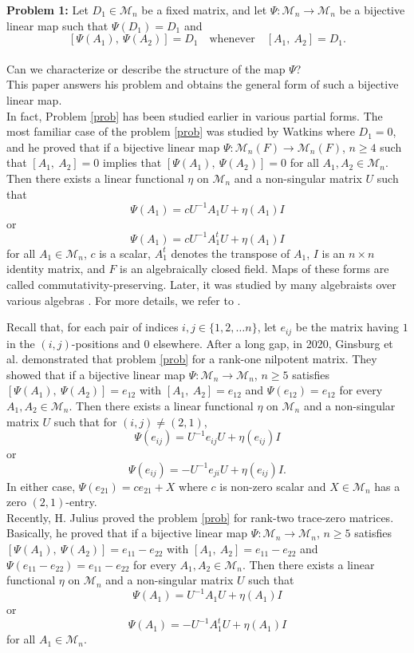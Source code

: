 \documentclass{amsart}
\theoremstyle{definition}
\theoremstyle{remark}
\numberwithin{equation}{section}
\begin{document}
 \textbf{Problem 1:}\label{prob} Let $D_1\in \mathscr{M}_n$ be a fixed matrix, and let $\Psi: \mathscr{M}_n \to \mathscr{M}_n$ be a bijective linear map such that $\Psi(D_1)=D_1$ and
	$$
	[\Psi(A_1),~\Psi(A_2)] = D_1 \quad \text{whenever} \quad  [A_1,~A_2] = D_1.
	$$\\
Can we characterize or describe the structure of the map $\Psi$?\\
This paper answers his problem and obtains the general form of such a bijective linear map.\\

In fact, Problem \ref{prob} has been studied earlier in various partial forms. The most familiar case of the problem \ref{prob} was studied by Watkins \cite{wat} where $D_1=0$, and he proved that if a bijective linear map $\Psi:\mathscr{M}_n(F) \to \mathscr{M}_n(F)$, $n\geq4$ such that $[A_1,~A_2]=0$ implies that $[\Psi(A_1),~\Psi(A_2)]=0$ for all $A_1,A_2 \in \mathscr{M}_n$. Then there exists a linear functional $\eta$ on $\mathscr{M}_n$ and a non-singular matrix $U$ such that $$\Psi(A_1)=cU^{-1}A_1U+\eta(A_1)I$$ or $$\Psi(A_1)=cU^{-1}A_1^tU+\eta(A_1)I$$ for all $A_1 \in \mathscr{M}_n$, $c$ is a scalar, $A_1^t$ denotes the transpose of $A_1$, $I$ is an $n\times n$ identity matrix, and $F$ is an algebraically closed field. Maps of these forms are called commutativity-preserving. Later, it was studied by many algebraists over various algebras \cite{bei1,bei2,bei3,bre1,bre2,Lin}. For more details, we refer to \cite{shi,cat2}.

Recall that, for each pair of indices $i,j \in \{1,2, \dots n \}$, let $e_{ij}$ be the matrix having $1$ in the $(i,j)$-positions and $0$ elsewhere. After a long gap, in 2020, Ginsburg et al. \cite{gin} demonstrated that problem \ref{prob} for a rank-one nilpotent matrix. They showed that if a bijective linear map $\Psi:\mathscr{M}_n \to \mathscr{M}_n$, $n\geq5$ satisfies $[\Psi(A_1),~ \Psi(A_2)]=e_{12}$ with $[A_1,~A_2]=e_{12}$ and $\Psi(e_{12})=e_{12}$ for every $A_1,A_2 \in \mathscr{M}_n$. Then there exists a linear functional $\eta$ on $\mathscr{M}_n$ and a non-singular matrix $U$ such that for $(i,j)\neq(2,1)$, $$\Psi(e_{ij})=U^{-1}e_{ij}U+\eta(e_{ij})I$$ or $$\Psi(e_{ij})=-U^{-1}e_{ji}U+\eta(e_{ij})I.$$ In either case, $\Psi(e_{21}) = ce_{21} + X$ where $c$ is non-zero scalar and $X \in \mathscr{M}_n$ has a zero $(2,1)$-entry. \\
Recently, H. Julius \cite{jul} proved the problem \ref{prob} for rank-two trace-zero matrices. Basically, he proved that if a bijective linear map $\Psi: \mathscr{M}_n \to \mathscr{M}_n$, $n \geq 5$ satisfies $[\Psi(A_1),~\Psi(A_2)]=e_{11}-e_{22}$ with $[A_1,~A_2]=e_{11}-e_{22}$ and $\Psi(e_{11}-e_{22})=e_{11}-e_{22}$ for every $A_1, A_2 \in \mathscr{M}_n$. Then there exists a linear functional $\eta$ on $\mathscr{M}_n$ and a non-singular matrix $U$  such that $$\Psi(A_1)=U^{-1}A_1U+\eta(A_1)I$$ or $$\Psi(A_1)=-U^{-1}A_1^tU+\eta(A_1)I$$ for all $A_1 \in \mathscr{M}_n$.\\
\end{document}
